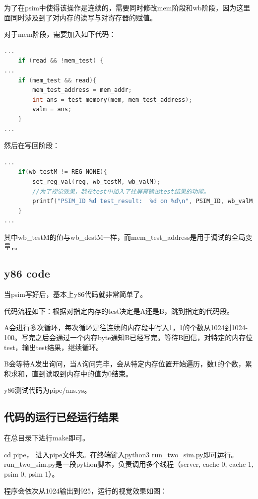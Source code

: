\documentclass{article}
\theoremstyle{plain} \newtheorem{theorem}{常识}[section]
\theoremstyle{plain} \newtheorem{lizi}{例}[section]
\begin{document}
为了在psim中使得该操作是连续的，需要同时修改mem阶段和wb阶段，因为这里面同时涉及到了对内存的读写与对寄存器的赋值。

对于mem阶段，需要加入如下代码：
\begin{lstlisting}[language=C]
...
    if (read && !mem_test) {
...
    if (mem_test && read){
        mem_test_address = mem_addr;
        int ans = test_memory(mem, mem_test_address);
        valm = ans;
    }
...
\end{lstlisting}

然后在写回阶段：
\begin{lstlisting}[language=C]
...
    if(wb_testM != REG_NONE){
        set_reg_val(reg, wb_testM, wb_valM);
        //为了视觉效果，我在test中加入了往屏幕输出test结果的功能。
        printf("PSIM_ID %d test_result:  %d on %d\n", PSIM_ID, wb_valM, mem_test_address);
    }
...
\end{lstlisting}
其中wb\_testM的值与wb\_destM一样，而mem\_test\_address是用于调试的全局变量，。

\subsection{y86 code}
当psim写好后，基本上y86代码就非常简单了。

代码流程如下：根据对指定内存的test决定是A还是B，跳到指定的代码段。

A会进行多次循环，每次循环是往连续的内存段中写入1，1的个数从1024到1024-100。写完之后会通过一个内存byte通知B已经写完。等待B回信，对特定的内存位test，输出test结果，继续循环。

B会等待A发出询问，当A询问完毕，会从特定内存位置开始遍历，数1的个数，累积求和，直到读取到内存中的值为0结束。

y86测试代码为pipe/ans.ys。

\subsection{代码的运行已经运行结果}
在总目录下进行make即可。

cd pipe， 进入pipe文件夹。在终端键入python3 run\_two\_sim.py即可运行。run\_two\_sim.py是一段python脚本，负责调用多个线程（server, cache 0, cache 1, psim 0, psim 1）。

程序会依次从1024输出到925，运行的视觉效果如图：
\end{document}
